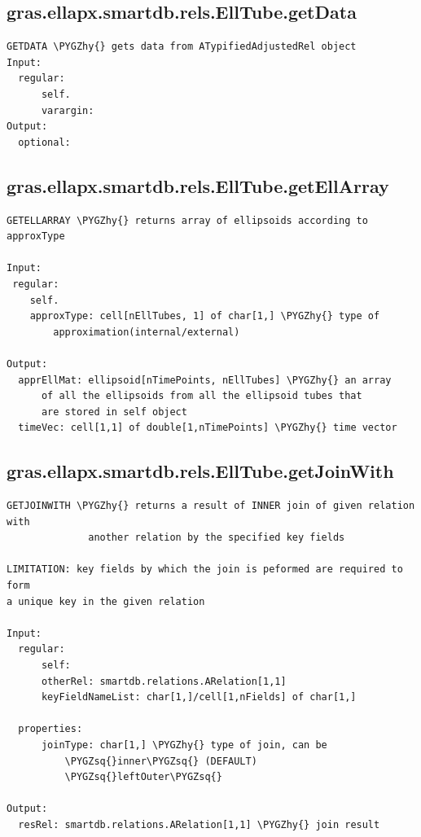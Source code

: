 \documentclass[letterpaper,10pt,english]{sphinxmanual}
\def\PYGZhy{\char`\-}
\def\PYGZsq{\char`\'}
\begin{document}
\subsection{gras.ellapx.smartdb.rels.EllTube.getData}
\label{chap_functions:gras-ellapx-smartdb-rels-elltube-getdata}
\begin{Verbatim}[commandchars=\\\{\}]
GETDATA \PYGZhy{} gets data from ATypifiedAdjustedRel object
Input:
  regular:
      self.
      varargin:
Output:
  optional:
\end{Verbatim}


\subsection{gras.ellapx.smartdb.rels.EllTube.getEllArray}
\label{chap_functions:gras-ellapx-smartdb-rels-elltube-getellarray}
\begin{Verbatim}[commandchars=\\\{\}]
GETELLARRAY \PYGZhy{} returns array of ellipsoids according to
approxType

Input:
 regular:
    self.
    approxType: cell[nEllTubes, 1] of char[1,] \PYGZhy{} type of
        approximation(internal/external)

Output:
  apprEllMat: ellipsoid[nTimePoints, nEllTubes] \PYGZhy{} an array
      of all the ellipsoids from all the ellipsoid tubes that
      are stored in self object
  timeVec: cell[1,1] of double[1,nTimePoints] \PYGZhy{} time vector
\end{Verbatim}


\subsection{gras.ellapx.smartdb.rels.EllTube.getJoinWith}
\label{chap_functions:gras-ellapx-smartdb-rels-elltube-getjoinwith}
\begin{Verbatim}[commandchars=\\\{\}]
GETJOINWITH \PYGZhy{} returns a result of INNER join of given relation with
              another relation by the specified key fields

LIMITATION: key fields by which the join is peformed are required to form
a unique key in the given relation

Input:
  regular:
      self:
      otherRel: smartdb.relations.ARelation[1,1]
      keyFieldNameList: char[1,]/cell[1,nFields] of char[1,]

  properties:
      joinType: char[1,] \PYGZhy{} type of join, can be
          \PYGZsq{}inner\PYGZsq{} (DEFAULT)
          \PYGZsq{}leftOuter\PYGZsq{}

Output:
  resRel: smartdb.relations.ARelation[1,1] \PYGZhy{} join result
\end{Verbatim}
\end{document}
